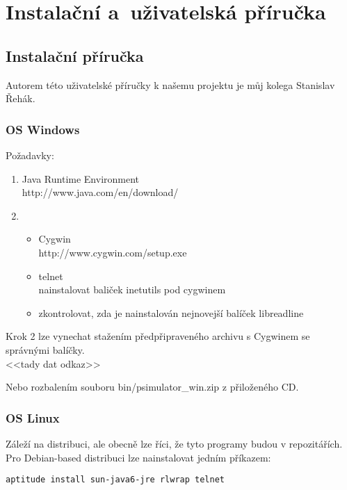 \chapter{Instalační a~uživatelská příručka}

\section{Instalační příručka}

Autorem této uživatelské příručky k našemu projektu je můj kolega Stanislav Řehák.

\subsection{OS Windows}
Požadavky:
\begin{enumerate}
 \item Java Runtime Environment\\
      http://www.java.com/en/download/

 \item
       \begin{itemize}
        \item Cygwin\\
    http://www.cygwin.com/setup.exe
	\item telnet\\
    nainstalovat baliček inetutils pod cygwinem
	\item zkontrolovat, zda je nainstalován nejnovejší balíček libreadline
       \end{itemize}


\end{enumerate}



\noindent
Krok 2 lze vynechat stažením předpřipraveného archivu s Cygwinem se správnými balíčky.\\
<<tady dat odkaz>>

\noindent
Nebo rozbalením souboru bin/psimulator\_win.zip z přiloženého CD.


\subsection{OS Linux}
Záleží na distribuci, ale obecně lze říci, že tyto programy budou v repozitářích.
Pro Debian-based distribuci lze nainstalovat jedním příkazem:
\begin{verbatim}
aptitude install sun-java6-jre rlwrap telnet
\end{verbatim} 

